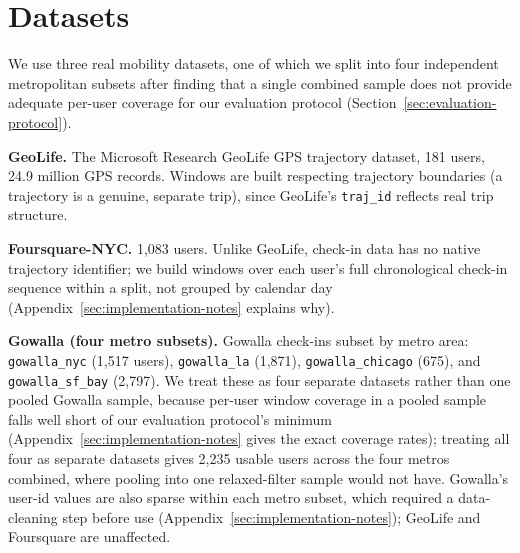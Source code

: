 \section{Datasets}
\label{sec:datasets}

We use three real mobility datasets, one of which we split into four
independent metropolitan subsets after finding that a single combined
sample does not provide adequate per-user coverage for our evaluation
protocol (Section~\ref{sec:evaluation-protocol}).

\textbf{GeoLife.} The Microsoft Research GeoLife GPS trajectory
dataset, 181 users, 24.9 million GPS records. Windows are built
respecting trajectory boundaries (a trajectory is a genuine, separate
trip), since GeoLife's \texttt{traj\_id} reflects real trip structure.

\textbf{Foursquare-NYC.} 1,083 users. Unlike GeoLife, check-in data has
no native trajectory identifier; we build windows over each user's full
chronological check-in sequence within a split, not grouped by calendar
day (Appendix~\ref{sec:implementation-notes} explains why).

\textbf{Gowalla (four metro subsets).} Gowalla check-ins subset by
metro area: \texttt{gowalla\_nyc} (1,517 users), \texttt{gowalla\_la}
(1,871), \texttt{gowalla\_chicago} (675), and \texttt{gowalla\_sf\_bay}
(2,797). We treat these as four separate datasets rather than one
pooled Gowalla sample, because per-user window coverage in a pooled
sample falls well short of our evaluation protocol's minimum
(Appendix~\ref{sec:implementation-notes} gives the exact coverage
rates); treating all four as separate datasets gives 2,235 usable users
across the four metros combined, where pooling into one relaxed-filter
sample would not have. Gowalla's user-id values are also sparse within
each metro subset, which required a data-cleaning step before use
(Appendix~\ref{sec:implementation-notes}); GeoLife and Foursquare are
unaffected.
